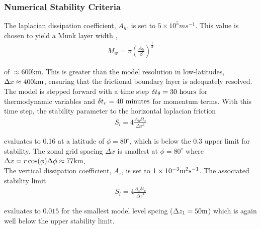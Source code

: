 {\subsubsection{Numerical Stability Criteria}

The laplacian dissipation coefficient, $A_{h}$, is set to $5 \times 10^5 m s^{-1}$.
This value is chosen to yield a Munk layer width \cite{Adcroft_thesis},
\begin{eqnarray}
\label{EQ:munk_layer}
M_{w} = \pi ( \frac { A_{h} }{ \beta } )^{\frac{1}{3}}
\end{eqnarray}

\noindent  of $\approx 600$km. This is greater than the model
resolution in low-latitudes, $\Delta x \approx 400{\rm km}$, ensuring that the frictional 
boundary layer is adequately resolved.
\\

\noindent The model is stepped forward with a 
time step $\delta t_{\theta}=30~{\rm hours}$ for thermodynamic variables and
$\delta t_{v}=40~{\rm minutes}$ for momentum terms. With this time step, the stability 
parameter to the horizontal laplacian friction \cite{Adcroft_thesis}
\begin{eqnarray}
\label{EQ:laplacian_stability}
S_{l} = 4 \frac{A_{h} \delta t_{v}}{{\Delta x}^2}
\end{eqnarray}

\noindent evaluates to 0.16 at a latitude of $\phi=80^{\circ}$, which is below the 
0.3 upper limit for stability. The zonal grid spacing $\Delta x$ is smallest at
$\phi=80^{\circ}$ where $\Delta x=r\cos(\phi)\Delta \phi\approx 77{\rm km}$.
\\

\noindent The vertical dissipation coefficient, $A_{z}$, is set to 
$1\times10^{-3} {\rm m}^2{\rm s}^{-1}$. The associated stability limit
\begin{eqnarray}
\label{EQ:laplacian_stability_z}
S_{l} = 4 \frac{A_{z} \delta t_{v}}{{\Delta z}^2}
\end{eqnarray}

\noindent evaluates to $0.015$ for the smallest model
level spcing ($\Delta z_{1}=50{\rm m}$) which is again well below
the upper stability limit.
\\

}
